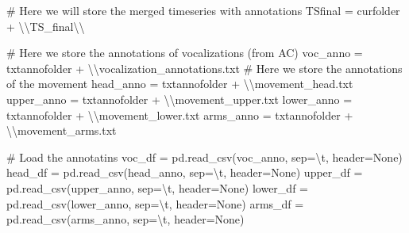 \documentclass[
  letterpaper,
  DIV=11,
  numbers=noendperiod]{scrreprt}
\newenvironment{Shaded}{\begin{snugshade}}{\end{snugshade}}
\newcommand{\CharTok}[1]{\textcolor[rgb]{0.13,0.47,0.30}{#1}}
\newcommand{\CommentTok}[1]{\textcolor[rgb]{0.37,0.37,0.37}{#1}}
\newcommand{\NormalTok}[1]{\textcolor[rgb]{0.00,0.23,0.31}{#1}}
\newcommand{\OperatorTok}[1]{\textcolor[rgb]{0.37,0.37,0.37}{#1}}
\newcommand{\StringTok}[1]{\textcolor[rgb]{0.13,0.47,0.30}{#1}}
\newcommand{\VariableTok}[1]{\textcolor[rgb]{0.07,0.07,0.07}{#1}}
\begin{document}
\begin{Shaded}
\begin{Highlighting}[]
\CommentTok{\# Here we will store the merged timeseries with annotations}
\NormalTok{TSfinal }\OperatorTok{=}\NormalTok{ curfolder }\OperatorTok{+} \StringTok{\textquotesingle{}}\CharTok{\textbackslash{}\textbackslash{}}\StringTok{TS\_final}\CharTok{\textbackslash{}\textbackslash{}}\StringTok{\textquotesingle{}}

\CommentTok{\# Here we store the annotations of vocalizations (from AC)}
\NormalTok{voc\_anno }\OperatorTok{=}\NormalTok{ txtannofolder }\OperatorTok{+} \StringTok{\textquotesingle{}}\CharTok{\textbackslash{}\textbackslash{}}\StringTok{vocalization\_annotations.txt\textquotesingle{}}
\CommentTok{\# Here we store the annotations of the movement}
\NormalTok{head\_anno }\OperatorTok{=}\NormalTok{ txtannofolder }\OperatorTok{+} \StringTok{\textquotesingle{}}\CharTok{\textbackslash{}\textbackslash{}}\StringTok{movement\_head.txt\textquotesingle{}}
\NormalTok{upper\_anno }\OperatorTok{=}\NormalTok{ txtannofolder }\OperatorTok{+} \StringTok{\textquotesingle{}}\CharTok{\textbackslash{}\textbackslash{}}\StringTok{movement\_upper.txt\textquotesingle{}}
\NormalTok{lower\_anno }\OperatorTok{=}\NormalTok{ txtannofolder }\OperatorTok{+} \StringTok{\textquotesingle{}}\CharTok{\textbackslash{}\textbackslash{}}\StringTok{movement\_lower.txt\textquotesingle{}}
\NormalTok{arms\_anno }\OperatorTok{=}\NormalTok{ txtannofolder }\OperatorTok{+} \StringTok{\textquotesingle{}}\CharTok{\textbackslash{}\textbackslash{}}\StringTok{movement\_arms.txt\textquotesingle{}}

\CommentTok{\# Load the annotatins}
\NormalTok{voc\_df }\OperatorTok{=}\NormalTok{ pd.read\_csv(voc\_anno, sep}\OperatorTok{=}\StringTok{\textquotesingle{}}\CharTok{\textbackslash{}t}\StringTok{\textquotesingle{}}\NormalTok{, header}\OperatorTok{=}\VariableTok{None}\NormalTok{)}
\NormalTok{head\_df }\OperatorTok{=}\NormalTok{ pd.read\_csv(head\_anno, sep}\OperatorTok{=}\StringTok{\textquotesingle{}}\CharTok{\textbackslash{}t}\StringTok{\textquotesingle{}}\NormalTok{, header}\OperatorTok{=}\VariableTok{None}\NormalTok{)}
\NormalTok{upper\_df }\OperatorTok{=}\NormalTok{ pd.read\_csv(upper\_anno, sep}\OperatorTok{=}\StringTok{\textquotesingle{}}\CharTok{\textbackslash{}t}\StringTok{\textquotesingle{}}\NormalTok{, header}\OperatorTok{=}\VariableTok{None}\NormalTok{)}
\NormalTok{lower\_df }\OperatorTok{=}\NormalTok{ pd.read\_csv(lower\_anno, sep}\OperatorTok{=}\StringTok{\textquotesingle{}}\CharTok{\textbackslash{}t}\StringTok{\textquotesingle{}}\NormalTok{, header}\OperatorTok{=}\VariableTok{None}\NormalTok{)}
\NormalTok{arms\_df }\OperatorTok{=}\NormalTok{ pd.read\_csv(arms\_anno, sep}\OperatorTok{=}\StringTok{\textquotesingle{}}\CharTok{\textbackslash{}t}\StringTok{\textquotesingle{}}\NormalTok{, header}\OperatorTok{=}\VariableTok{None}\NormalTok{)}


\end{Highlighting}
\end{Shaded}
\end{document}
